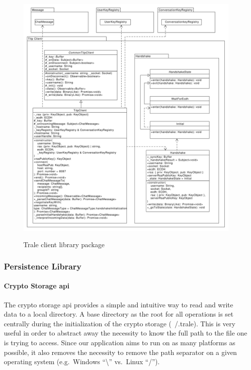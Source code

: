 \begin{figure}[H]
    \centering
    \caption{Trale client library package}
    \hspace*{-2.9cm}
    \includegraphics[width=1.3\textwidth]{./graphics/classDiagramTransportLibrary-TitpClient}
    \label{fig:figure37}
\end{figure}

\subsubsection{Persistence Library}

\paragraph{Crypto Storage \ac{api}}

The crypto storage \ac{api} provides a simple and intuitive way to read and write data to a local directory.
A base directory as the root for all operations is set centrally during the initialization of the crypto storage
(~/.trale).
This is very useful in order to abstract away the necessity to know the full path to the file one is trying to access.
Since our application aims to run on as many platforms as possible, it also removes the necessity to remove the path
separator on a given operating system (e.g.\ Windows \enquote{\textbackslash} vs.\ Linux \enquote{/}).

